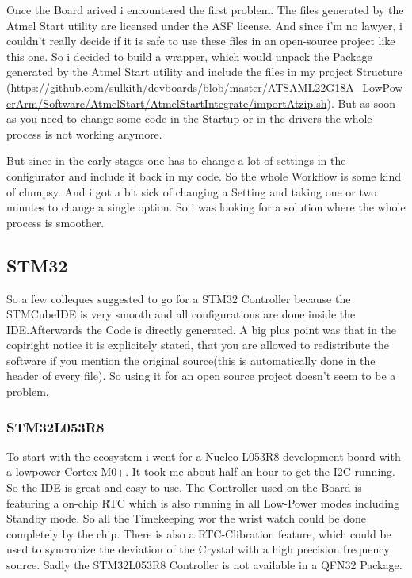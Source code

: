 Once the Board arived i encountered the first problem. The files generated by the Atmel Start utility are licensed under the ASF license. And since i'm no lawyer, i couldn't really decide if it is safe to use these files in an open-source project like this one. So i decided to build a wrapper, which would unpack the Package generated by the Atmel Start utility and include the files in my project Structure (\url{https://github.com/sulkith/devboards/blob/master/ATSAML22G18A_LowPowerArm/Software/AtmelStart/AtmelStartIntegrate/importAtzip.sh}). But as soon as you need to change some code in the Startup or in the drivers the whole process is not working anymore.

But since in the early stages one has to change a lot of settings in the configurator and include it back in my code. So the whole Workflow is some kind of clumpsy. And i got a bit sick of changing a Setting and taking one or two minutes to change a single option. So i was looking for a solution where the whole process is smoother.

\subsection{STM32}
So a few colleques suggested to go for a STM32 Controller because the STMCubeIDE is very smooth and all configurations are done inside the IDE.Afterwards the Code is directly generated. A big plus point was that in the copiright notice it is explicitely stated, that you are allowed to redistribute the software if you mention the original source(this is automatically done in the header of every file). So using it for an open source project doesn't seem to be a problem.

\subsubsection{STM32L053R8}
To start with the ecosystem i went for a Nucleo-L053R8 development board with a lowpower Cortex M0+. It took me about half an hour to get the I2C running. So the IDE is great and easy to use. The Controller used on the Board is featuring a on-chip RTC which is also running in all Low-Power modes including Standby mode. So all the Timekeeping wor the wrist watch could be done completely by the chip. There is also a RTC-Clibration feature, which could be used to syncronize the deviation of the Crystal with a high precision frequency source. 
Sadly the STM32L053R8 Controller is not available in a QFN32 Package.

